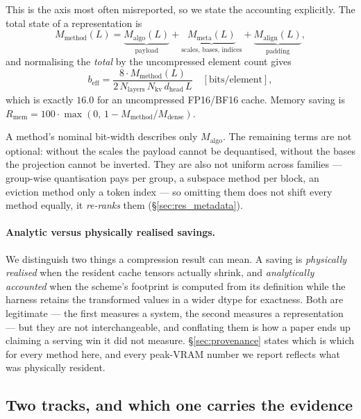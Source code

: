 \documentclass[sigplan,10pt,anonymous,review,nonacm]{acmart}
\newcommand{\beff}{b_{\text{eff}}}
\begin{document}
This is the axis most often misreported, so we state the accounting
explicitly. The total state of a representation is
\begin{equation}
\label{eq:memory}
M_{\text{method}}(L) = \underbrace{M_{\text{algo}}(L)}_{\text{payload}}
                     + \underbrace{M_{\text{meta}}(L)}_{\text{scales, bases, indices}}
                     + \underbrace{M_{\text{align}}(L)}_{\text{padding}},
\end{equation}
and normalising the \emph{total} by the uncompressed element count gives
\begin{equation}
\label{eq:beff}
\beff = \frac{8 \cdot M_{\text{method}}(L)}
             {2 \, N_{\text{layers}} \, N_{\text{kv}} \, d_{\text{head}} \, L}
        \quad [\text{bits/element}],
\end{equation}
which is exactly $16.0$ for an uncompressed FP16/BF16 cache. Memory saving is
$R_{\text{mem}} = 100 \cdot \max(0,\, 1 - M_{\text{method}}/M_{\text{dense}})$.

A method's nominal bit-width describes only $M_{\text{algo}}$. The remaining
terms are not optional: without the scales the payload cannot be dequantised,
without the bases the projection cannot be inverted. They are also not uniform
across families --- group-wise quantisation pays per group, a subspace method
per block, an eviction method only a token index --- so omitting them does not
shift every method equally, it \emph{re-ranks} them
(\S\ref{sec:res_metadata}).

\paragraph{Analytic versus physically realised savings.}
We distinguish two things a compression result can mean. A saving is
\emph{physically realised} when the resident cache tensors actually shrink,
and \emph{analytically accounted} when the scheme's footprint is computed from
its definition while the harness retains the transformed values in a wider
dtype for exactness. Both are legitimate --- the first measures a system, the
second measures a representation --- but they are not interchangeable, and
conflating them is how a paper ends up claiming a serving win it did not
measure. \S\ref{sec:provenance} states which is which for every method here,
and every peak-VRAM number we report reflects what was physically resident.

\subsection{Two tracks, and which one carries the evidence}
\label{sec:parts}
\end{document}
